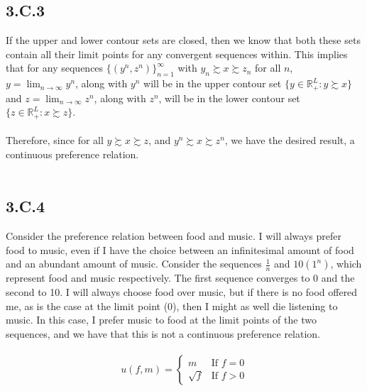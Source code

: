 \documentclass[letterpaper,12pt]{article}
\theoremstyle{definition}
\begin{document}
\subsection*{3.C.3}

If the upper and lower contour sets are closed, then we know that both these sets contain all their limit points for any convergent sequences within. This implies that for any sequences $\{(y^n, z^n)\}_{n=1}^\infty$ with $y_n \succsim x \succsim z_n$ for all $n$, $y = \lim_{n \to \infty} y^n$, along with $y^n$ will be in the upper contour set $\{y \in \mathbb{R}^L_+: y \succsim x\}$ and $z = \lim_{n \to \infty} z^n$, along with $z^n$, will be in the lower contour set $\{z \in \mathbb{R}^L_+: x \succsim z\}$.\\\\
Therefore, since for all $y \succsim x \succsim z$, and $y^n \succsim x \succsim z^n$, we have the desired result, a continuous preference relation.\\\\

\subsection*{3.C.4}
Consider the preference relation between food and music. I will always prefer food to music, even if I have the choice between an infinitesimal amount of food and an abundant amount of music. Consider the sequences $\frac{1}{n}$ and $10(1^n)$, which represent food and music respectively. The first sequence converges to 0 and the second to 10. I will always choose food over music, but if there is no food offered me, as is the case at the limit point ($0$), then I might as well die listening to music. In this case, I prefer music to food at the limit points of the two sequences, and we have that this is not a continuous preference relation. 
\\\\
\[ u(f,m) = 
\begin{cases}
    m & \text{If $f = 0$}\\
    \sqrt{f} & \text{If $f > 0$}
\end{cases}\]
\end{document}
